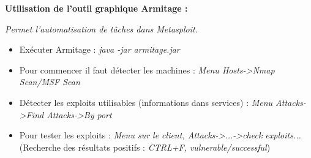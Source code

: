 \documentclass[a4paper,11pt]{article}				    %
\begin{document}
{\textbf{Utilisation de l'outil graphique Armitage :}\\
\textit{Permet l'automatisation de t\^aches dans Metasploit.}
\begin{itemize}
	\item Ex\'ecuter Armitage : {\sl \color{blue}java -jar armitage.jar}
	\item Pour commencer il faut d\'etecter les machines : {\sl \color{blue}Menu Hosts->Nmap Scan/MSF Scan}
	\item D\'etecter les exploits utilisables (informations dans services) : {\sl \color{blue}Menu Attacks->Find Attacks->By port}
	\item Pour tester les exploits : {\sl \color{blue}Menu sur le client, Attacks->...->check exploits...}\\
		(Recherche des r\'esultats positifs : {\sl \color{blue}CTRL+F, vulnerable/successful})
\end{itemize}
}
\end{document}
